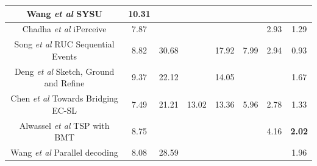 \begin{table}[h]
\begin{tabular}{|c|cclllcc|}
		{Wang \textit{et al} \cite{wang2020densecaptioning} SYSU}                        & \multicolumn{1}{c|}{\textbf{10.31}}         & \multicolumn{1}{l|}{}               & \multicolumn{1}{l|}{}                & \multicolumn{1}{l|}{}                & \multicolumn{1}{l|}{}              & \multicolumn{1}{c|}{}              &                                    \\ \hline
		Chadha \textit{et al} \cite{chadha2020iperceive} iPerceive                 & \multicolumn{1}{c|}{7.87}          & \multicolumn{1}{l|}{}               & \multicolumn{1}{l|}{}                & \multicolumn{1}{l|}{}                & \multicolumn{1}{l|}{}              & \multicolumn{1}{c|}{2.93}          & 1.29                               \\ \hline
		Song \textit{et al} \cite{songruc} RUC Sequential Events                 & \multicolumn{1}{c|}{8.82}          & \multicolumn{1}{l|}{30.68}               & \multicolumn{1}{l|}{}                & \multicolumn{1}{l|}{17.92}                & \multicolumn{1}{l|}{7.99}              & \multicolumn{1}{c|}{2.94}          & 0.93                               \\ \hline
		Deng \textit{et al} \cite{deng2021sketch} Sketch, Ground and Refine   & \multicolumn{1}{c|}{9.37}          & \multicolumn{1}{c|}{22.12}          & \multicolumn{1}{l|}{}                & \multicolumn{1}{l|}{14.05}           & \multicolumn{1}{l|}{}              & \multicolumn{1}{c|}{}              & 1.67                               \\ \hline
		Chen \textit{et al} \cite{chen2021towards} Towards Bridging EC-SL      & \multicolumn{1}{c|}{7.49}          & \multicolumn{1}{c|}{21.21}          & \multicolumn{1}{l|}{13.02}           & \multicolumn{1}{l|}{13.36}           & \multicolumn{1}{l|}{5.96}          & \multicolumn{1}{c|}{2.78}          & 1.33                               \\ \hline
		{Alwassel \textit{et al} \cite{alwassel2021tsp} TSP with BMT}            & \multicolumn{1}{c|}{8.75}          & \multicolumn{1}{l|}{}               & \multicolumn{1}{l|}{}                & \multicolumn{1}{l|}{}                & \multicolumn{1}{l|}{}              & \multicolumn{1}{c|}{4.16}          & \textbf{2.02}                               \\ \hline
		Wang \textit{et al} \cite{wang2021endtoend} Parallel decoding           & \multicolumn{1}{c|}{8.08}          & \multicolumn{1}{c|}{28.59}          & \multicolumn{1}{l|}{}                & \multicolumn{1}{l|}{}                & \multicolumn{1}{l|}{}              & \multicolumn{1}{c|}{}              & 1.96                               \\ \hline

\end{tabular}
\end{table}
